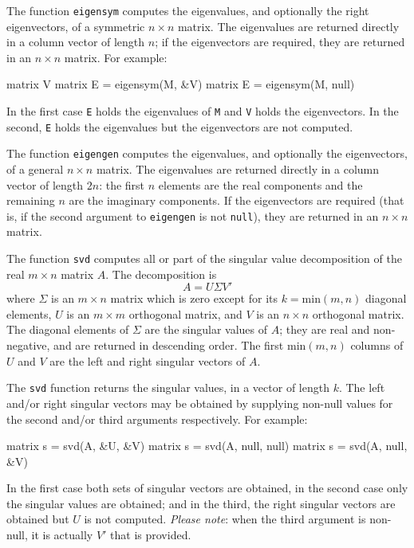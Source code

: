 The function \texttt{eigensym} computes the eigenvalues, and
optionally the right eigenvectors, of a symmetric $n \times n$ matrix.
The eigenvalues are returned directly in a column vector of length
$n$; if the eigenvectors are required, they are returned in an $n
\times n$ matrix.  For example:
%
\begin{code}
matrix V
matrix E = eigensym(M, &V)
matrix E = eigensym(M, null)
\end{code}
%
In the first case \texttt{E} holds the eigenvalues of \texttt{M} and
\texttt{V} holds the eigenvectors.  In the second, \texttt{E} holds
the eigenvalues but the eigenvectors are not computed.

The function \texttt{eigengen} computes the eigenvalues, and
optionally the eigenvectors, of a general $n \times n$ matrix.  The
eigenvalues are returned directly in a column vector of length $2n$:
the first $n$ elements are the real components and the remaining $n$
are the imaginary components.  If the eigenvectors are required (that
is, if the second argument to \texttt{eigengen} is not \texttt{null}),
they are returned in an $n \times n$ matrix.

The function \texttt{svd} computes all or part of the singular value
decomposition of the real $m \times n$ matrix $A$.  The decomposition
is
\[
A = U \Sigma V'
\]
where $\Sigma$ is an $m \times n$ matrix which is zero except for its
$k = \mbox{min}(m, n)$ diagonal elements, $U$ is an $m \times m$
orthogonal matrix, and $V$ is an $n \times n$ orthogonal matrix.  The
diagonal elements of $\Sigma$ are the singular values of $A$; they are
real and non-negative, and are returned in descending order.  The
first $\mbox{min}(m, n)$ columns of $U$ and $V$ are the left and right
singular vectors of $A$.

The \texttt{svd} function returns the singular values, in a vector of
length $k$.  The left and/or right singular vectors may be obtained by
supplying non-null values for the second and/or third arguments
respectively.  For example:
%
\begin{code}
matrix s = svd(A, &U, &V)
matrix s = svd(A, null, null)
matrix s = svd(A, null, &V)
\end{code}
%
In the first case both sets of singular vectors are obtained, in the
second case only the singular values are obtained; and in the third,
the right singular vectors are obtained but $U$ is not computed.
\emph{Please note}: when the third argument is non-null, it is
actually $V'$ that is provided.


